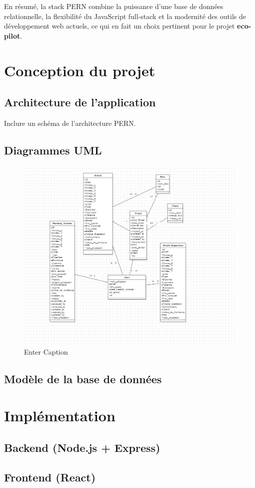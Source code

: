 \documentclass[12pt,a4paper]{report}
\begin{document}
En résumé, la stack PERN combine la puissance d’une base de données relationnelle, la flexibilité du JavaScript full-stack et la modernité des outils de développement web actuels, ce qui en fait un choix pertinent pour le projet \textbf{eco-pilot}.

\chapter{Conception du projet}
\section{Architecture de l’application}
Inclure un schéma de l’architecture PERN.  

\section{Diagrammes UML}

\begin{figure}[H]
    \centering
    \includegraphics[width=0.5\linewidth]{image.png}
    \caption{Enter Caption}
    \label{fig:placeholder}
\end{figure}

\section{Modèle de la base de données}

\chapter{Implémentation}
\section{Backend (Node.js + Express)}
\section{Frontend (React)}
\end{document}
